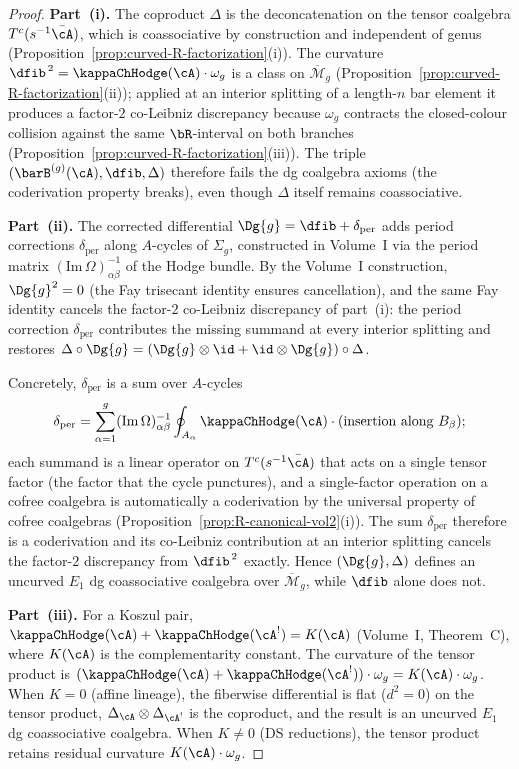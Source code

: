 \begin{proof}
\textbf{Part~(i).}
The coproduct $\Delta$ is the deconcatenation on the tensor
coalgebra $T^c(s^{-1}\bar{\cA})$, which is coassociative by
construction and independent of genus
(Proposition~\ref{prop:curved-R-factorization}\textup{(i)}).
The curvature
$\dfib^{\,2} = \kappaChHodge(\cA)\cdot\omega_g$ is a class on
$\overline{\mathcal{M}}_g$
(Proposition~\ref{prop:curved-R-factorization}\textup{(ii)});
applied at an interior splitting of a length-$n$ bar element
it produces a factor-$2$ co-Leibniz discrepancy because
$\omega_g$ contracts the closed-colour collision against the
same $\bR$-interval on both branches
(Proposition~\ref{prop:curved-R-factorization}\textup{(iii)}).
The triple $(\barB^{(g)}(\cA), \dfib, \Delta)$ therefore fails
the dg coalgebra axioms (the coderivation property breaks),
even though $\Delta$ itself remains coassociative.

\textbf{Part~(ii).}
The corrected differential $\Dg{g} = \dfib + \delta_{\mathrm{per}}$
adds period corrections $\delta_{\mathrm{per}}$ along $A$-cycles
of $\Sigma_g$, constructed in Volume~I via the period matrix
$(\mathrm{Im}\,\Omega)^{-1}_{\alpha\beta}$ of the Hodge bundle.
By the Volume~I construction, $\Dg{g}^2 = 0$
\textup{(}the Fay trisecant identity ensures cancellation\textup{)},
and the same Fay identity cancels the factor-$2$ co-Leibniz
discrepancy of part~(i): the period correction
$\delta_{\mathrm{per}}$ contributes the missing summand at
every interior splitting and restores
$\Delta\circ\Dg{g} = (\Dg{g}\otimes\id+\id\otimes\Dg{g})\circ\Delta$.

Concretely, $\delta_{\mathrm{per}}$ is a sum over $A$-cycles
\[
\delta_{\mathrm{per}} = \sum_{\alpha=1}^{g}
 (\mathrm{Im}\,\Omega)^{-1}_{\alpha\beta}
 \oint_{A_\alpha} \kappaChHodge(\cA) \cdot (\text{insertion along }
 B_\beta);
\]
each summand is a linear operator on $T^c(s^{-1}\bar{\cA})$
that acts on a single tensor factor (the factor that the cycle
punctures), and a single-factor operation on a cofree coalgebra
is automatically a coderivation by the universal property of
cofree coalgebras
(Proposition~\ref{prop:R-canonical-vol2}\textup{(i)}). The
sum $\delta_{\mathrm{per}}$ therefore is a coderivation and
its co-Leibniz contribution at an interior splitting cancels
the factor-$2$ discrepancy from $\dfib^{\,2}$ exactly.
Hence $(\Dg{g}, \Delta)$ defines an uncurved
$E_1$ dg coassociative coalgebra over $\overline{\mathcal{M}}_g$, while
$\dfib$ alone does not.

\textbf{Part~(iii).}
For a Koszul pair, $\kappaChHodge(\cA) + \kappaChHodge(\cA^!) = K(\cA)$
(Volume~I, Theorem~C), where $K(\cA)$ is the complementarity
constant. The curvature of the tensor product is
$(\kappaChHodge(\cA) + \kappaChHodge(\cA^!)) \cdot \omega_g
= K(\cA) \cdot \omega_g$. When $K = 0$ (affine lineage), the
fiberwise differential is flat ($d^2 = 0$) on the tensor product,
$\Delta_{\cA} \otimes \Delta_{\cA^!}$ is the coproduct, and the
result is an uncurved $E_1$ dg coassociative coalgebra. When $K \neq 0$
(DS reductions), the tensor product retains residual curvature
$K(\cA) \cdot \omega_g$.
\end{proof}

